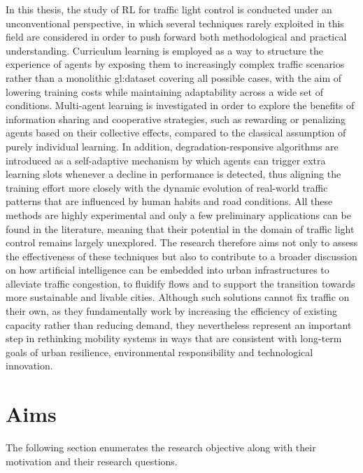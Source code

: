In this thesis, the study of RL for traffic light control is conducted under an unconventional perspective, in which several techniques rarely exploited in this field are considered in order to push forward both methodological and practical understanding.
Curriculum learning is employed as a way to structure the experience of agents by exposing them to increasingly complex traffic scenarios rather than a monolithic \gls{gl:dataset} covering all possible cases, with the aim of lowering training costs while maintaining adaptability across a wide set of conditions.
Multi-agent learning is investigated in order to explore the benefits of information sharing and cooperative strategies, such as rewarding or penalizing agents based on their collective effects, compared to the classical assumption of purely individual learning.
In addition, degradation-responsive algorithms are introduced as a self-adaptive mechanism by which agents can trigger extra learning slots whenever a decline in performance is detected, thus aligning the training effort more closely with the dynamic evolution of real-world traffic patterns that are influenced by human habits and road conditions.
All these methods are highly experimental and only a few preliminary applications can be found in the literature, meaning that their potential in the domain of traffic light control remains largely unexplored.
The research therefore aims not only to assess the effectiveness of these techniques but also to contribute to a broader discussion on how artificial intelligence can be embedded into urban infrastructures to alleviate traffic congestion, to fluidify flows and to support the transition towards more sustainable and livable cities.
Although such solutions cannot fix traffic on their own, as they fundamentally work by increasing the efficiency of existing capacity rather than reducing demand, they nevertheless represent an important step in rethinking mobility systems in ways that are consistent with long-term goals of urban resilience, environmental responsibility and technological innovation.

\section{Aims}

The following section enumerates the research objective along with their motivation and their research questions.

